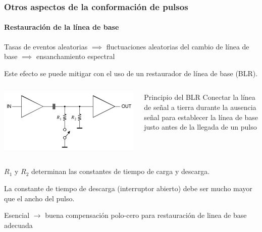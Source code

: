 \documentclass{beamer}
\begin{document}
\begin{frame}
\frametitle{Otros aspectos de la conformación de pulsos}
\framesubtitle{Restauración de la línea de base}
Tasas de eventos aleatorias $\implies$ fluctuaciones aleatorias del cambio de
línea de base $\implies$ {\color{blue}ensanchamiento espectral}

Este efecto se puede mitigar con el uso de un restaurador de línea de base (BLR).
\begin{columns}
\begin{column}{0.5\textwidth}
\begin{center}
\includegraphics[width=\textwidth]{d2/circuito_blr}
\end{center}
\end{column}
\begin{column}{0.5\textwidth}
\begin{alertblock}{Principio del BLR}
Conectar la línea de señal a tierra durante la ausencia señal para establecer la
línea de base justo antes de la llegada de un pulso
\end{alertblock}
\end{column}
\end{columns}
$R_1$ y $R_2$ determinan las constantes de tiempo de carga y descarga.

La constante de tiempo de descarga (interruptor abierto) debe ser mucho mayor
que el ancho del pulso.

\alert{Esencial} $\rightarrow$ buena compensación polo-cero para restauración de linea de base 
adecuada
\end{frame} 
\end{document}
